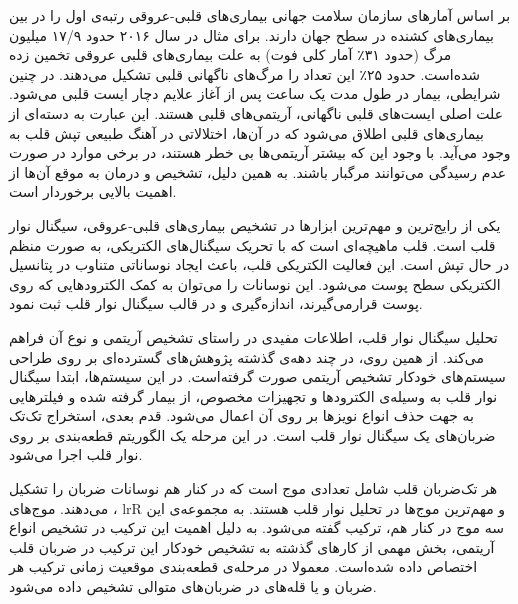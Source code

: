 
\pagebreak

بر اساس آمارهای سازمان سلامت جهانی بیماری‌های قلبی-عروقی  رتبه‌ی اول را در بین بیماری‌های کشنده در سطح جهان دارند. برای مثال در سال ۲۰۱۶ حدود ۱۷/۹ میلیون مرگ (حدود ۳۱٪ آمار کلی فوت) به علت بیماری‌های قلبی عروقی تخمین زده شده‌است. \cite{WHO} حدود ۲۵٪ این تعداد را مرگ‌های ناگهانی قلبی  تشکیل می‌دهند. \cite{Srinivasan2018} در چنین شرایطی، بیمار در طول مدت یک ساعت پس از آغاز علایم دچار ایست قلبی می‌شود. 
علت اصلی ایست‌های قلبی ناگهانی، آریتمی‌های قلبی هستند. \cite{Cleveland} این عبارت به دسته‌ای از بیماری‌های قلبی اطلاق می‌شود که در آن‌ها، اختلالاتی در آهنگ طبیعی تپش قلب به وجود می‌آید. با وجود این که بیشتر آریتمی‌ها بی خطر هستند، در برخی موارد در صورت عدم رسیدگی می‌توانند مرگبار باشند. به همین دلیل، تشخیص و درمان به موقع آن‌ها از اهمیت بالایی برخوردار است. 

یکی از رایج‌ترین و مهم‌ترین ابزارها در تشخیص بیماری‌های قلبی-عروقی، سیگنال نوار قلب  است. \cite {Elgendi2014} قلب ماهیچه‌ای است که با تحریک سیگنال‌های الکتریکی، به صورت منظم در حال تپش است. این فعالیت الکتریکی قلب، باعث ایجاد نوساناتی متناوب در پتانسیل الکتریکی سطح پوست می‌شود. این نوسانات  را می‌توان به کمک الکترودهایی که روی پوست قرارمی‌گیرند، اندازه‌گیری و در قالب سیگنال نوار قلب ثبت نمود. 

تحلیل سیگنال نوار قلب، اطلاعات مفیدی در راستای تشخیص آریتمی و نوع آن فراهم می‌کند. \cite{Mondejar} از همین روی، در چند دهه‌ی گذشته پژوهش‌های گسترده‌ای بر روی طراحی سیستم‌های خودکار تشخیص آریتمی صورت گرفته‌است. در این سیستم‌ها، ابتدا سیگنال نوار قلب به وسیله‌ی الکترودها و تجهیزات مخصوص، از بیمار گرفته شده و فیلترهایی به جهت حذف انواع نویزها بر روی آن اعمال می‌شود. قدم بعدی، استخراج تک‌تک ضربان‌های یک سیگنال نوار قلب است. در این مرحله یک الگوریتم قطعه‌بندی  بر روی نوار قلب اجرا می‌شود.

هر تک‌ضربان قلب شامل تعدادی موج است که در کنار هم نوسانات ضربان را تشکیل می‌دهند. موج‌های ، lr{R} و  مهم‌ترین موج‌ها در تحلیل نوار قلب هستند.\cite{Mondejar} به مجموعه‌ی این سه موج در کنار هم، ترکیب  گفته می‌شود. به دلیل اهمیت این ترکیب در تشخیص انواع آریتمی، بخش مهمی از کارهای گذشته به تشخیص خودکار این ترکیب در ضربان قلب اختصاص داده شده‌است. معمولا در مرحله‌ی قطعه‌بندی موقعیت زمانی ترکیب  هر ضربان و یا قله‌های  در ضربان‌های متوالی تشخیص داده می‌شود.

